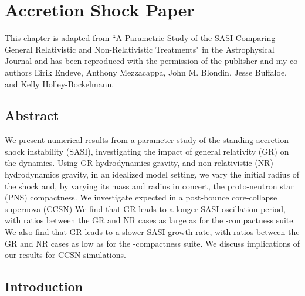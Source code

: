 \chapter{Accretion Shock Paper}

This chapter is adapted from
``A Parametric Study of the SASI Comparing General Relativistic
and Non-Relativistic Treatments" in the Astrophysical Journal and has been
reproduced with the permission of the publisher and my co-authors
Eirik Endeve, Anthony Mezzacappa, John M. Blondin, Jesse Buffaloe, and Kelly
Holley-Bockelmann.

\section{Abstract}
We present numerical results from a parameter study of the
standing accretion shock instability (SASI),
investigating the impact of general relativity (GR) on the dynamics.
Using GR hydrodynamics  gravity, and non-relativistic (NR)
hydrodynamics  gravity,
in an idealized model setting, we vary the initial radius of the shock and,
by varying its mass and radius in concert,
the proto-neutron star (PNS) compactness.
We investigate  expected in a
post-bounce core-collapse supernova
(CCSN)
We find that GR leads to a longer SASI oscillation period,
with ratios between the GR and NR cases as large as \PeriodRatioGRoverNRxiD{}
for the -compactness suite.
We also find that GR leads to a slower SASI growth rate,
with ratios between the GR and NR cases as low as \GrowthRateRatioGRoverNRxiD{}
for the -compactness suite. We discuss implications of our
results for CCSN simulations.

\section{Introduction}

